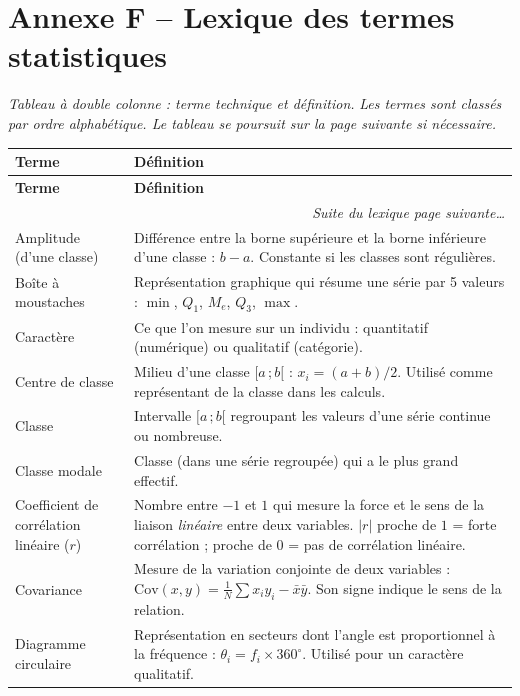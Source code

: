 \documentclass[11pt,a4paper]{article}
\begin{document}
\section*{\color{biocolor}Annexe F -- Lexique des termes statistiques}
\emph{Tableau à double colonne : terme technique et définition.}
\emph{Les termes sont classés par ordre alphabétique. Le tableau se poursuit sur la page suivante si nécessaire.}

\vspace{0.3cm}

{\small
\renewcommand{\arraystretch}{1.3}
\begin{longtable}{|p{3cm}|p{12.5cm}|}
\hline
\textbf{Terme} & \textbf{Définition} \\
\hline
\endfirsthead
\hline
\textbf{Terme} & \textbf{Définition} \\
\hline
\endhead
\hline
\multicolumn{2}{|r|}{\emph{Suite du lexique page suivante\dots}} \\
\endfoot
\hline
\endlastfoot
Amplitude (d'une classe) & Différence entre la borne supérieure et la borne inférieure d'une classe : $b-a$. Constante si les classes sont régulières. \\
\hline
Boîte à moustaches & Représentation graphique qui résume une série par 5 valeurs : $\min$, $Q_1$, $M_e$, $Q_3$, $\max$. \\
\hline
Caractère & Ce que l'on mesure sur un individu : quantitatif (numérique) ou qualitatif (catégorie). \\
\hline
Centre de classe & Milieu d'une classe $[a\,;b[$ : $x_i = (a+b)/2$. Utilisé comme représentant de la classe dans les calculs. \\
\hline
Classe & Intervalle $[a\,;b[$ regroupant les valeurs d'une série continue ou nombreuse. \\
\hline
Classe modale & Classe (dans une série regroupée) qui a le plus grand effectif. \\
\hline
Coefficient de corrélation linéaire ($r$) & Nombre entre $-1$ et $1$ qui mesure la force et le sens de la liaison \emph{linéaire} entre deux variables. $|r|$ proche de $1$ = forte corrélation ; proche de $0$ = pas de corrélation linéaire. \\
\hline
Covariance & Mesure de la variation conjointe de deux variables : $\mathrm{Cov}(x,y)=\frac{1}{N}\sum x_i y_i - \bar{x}\bar{y}$. Son signe indique le sens de la relation. \\
\hline
Diagramme circulaire & Représentation en secteurs dont l'angle est proportionnel à la fréquence : $\theta_i = f_i \times 360^\circ$. Utilisé pour un caractère qualitatif. \\

\end{longtable}}
\end{document}
